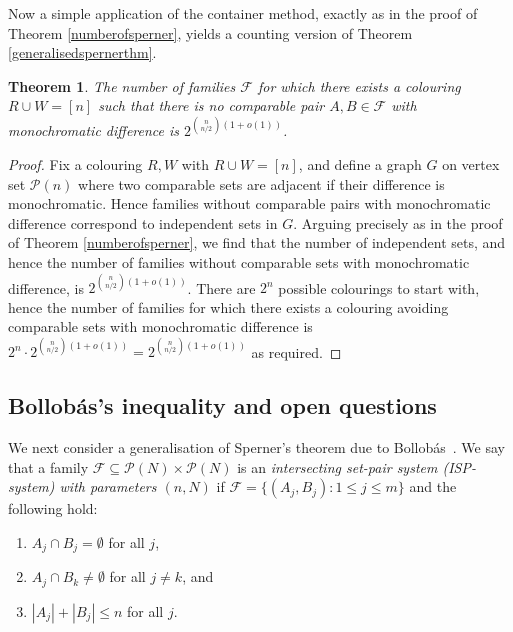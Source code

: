 \documentclass[11pt]{article}
\newtheorem{thm}[theorem]{Theorem}
\numberwithin{equation}{section}
\begin{document}
Now a simple application of the container method, exactly as in the proof of Theorem \ref{numberofsperner}, yields a counting version of Theorem \ref{generalisedspernerthm}.  


\begin{thm}\label{twocolourspernercounting}
The number of families $\mathcal{F}$ for which there exists a colouring $R\cup W=[n]$ such that there is no comparable pair $A,B\in\mathcal{F}$ with monochromatic difference is $2^{\binom{n}{n/2}(1+o(1))}$.
\end{thm}

\begin{proof}
Fix a colouring $R,W$ with $R\cup W=[n]$, and define a graph $G$ on vertex set $\mathcal{P}(n)$ where two comparable sets are adjacent if their difference is monochromatic. Hence families without comparable pairs with monochromatic difference  correspond to independent sets in $G$. Arguing precisely as in the proof of Theorem \ref{numberofsperner}, we find that the number of independent sets, and hence the number of families without comparable sets with monochromatic difference, is $2^{\binom{n}{n/2}\left(1+o(1)\right)}$. There are $2^n$ possible colourings to start with, hence the number of families for which there exists a colouring avoiding comparable sets with monochromatic difference is $2^n\cdot 2^{\binom{n}{n/2}\left(1+o(1)\right)}=2^{\binom{n}{n/2}\left(1+o(1)\right)}$ as required.
\end{proof}




\subsection{Bollob\'{a}s's inequality and open questions}\label{sec73}
We next consider a generalisation of Sperner's theorem due to Bollob\'{a}s~\cite{bollobassperner}.
We say that a family $\mathcal{F}\subseteq\mathcal{P}(N)\times\mathcal{P}(N)$ is an \emph{intersecting set-pair system (ISP-system) with parameters $(n,N)$} if $\mathcal{F}=\{(A_j,B_j): 1\leq j\leq m\}$ and the following hold:
\begin{enumerate}
\item[(1)] $A_j\cap B_j=\emptyset$ for all $j$,
\item[(2)] $A_j\cap B_k\neq \emptyset$ for all $j\neq k$, and
\item[(3)]  $|A_j|+|B_j|\leq n$ for all $j$.
\end{enumerate}
\end{document}
